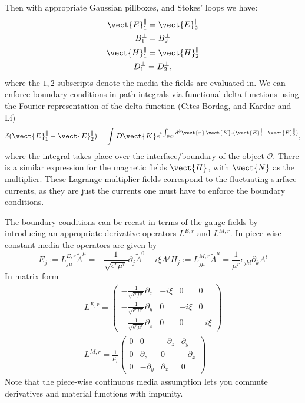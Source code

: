 Then with appropriate Gaussian pillboxes, and Stokes' loops we have:
\begin{gather}
  \vect{E}^\|_1 =\vect{E}^\|_2 \\
  B_1^\perp = B_2^\perp\\
  \vect{H}^\|_1 =\vect{H}^\|_2 \\
  D_1^\perp = D_2^\perp,
\end{gather}
where the $1,2$ subscripts denote the media the fields are evaluated in.  
We can enforce boundary conditions in path integrals via functional delta functions using
the Fourier representation of the delta function 
(Cites Bordag, and Kardar and Li)
\begin{equation}
  \delta(\vect{E}^\|_1-\vect{E}^\|_2) = \int D\vect{K} e^{i\int_{\partial \mathcal{O}} d^3\vect{x}\,
    \vect{K}\cdot(\vect{E}^\|_1-\vect{E}^\|_2)},
\end{equation}
where the integral takes place over the interface/boundary of the object $\mathcal{O}$.
There is a similar expression for the magnetic fields $\vect{H}$, with $\vect{N}$ as the multiplier.  
These Lagrange multiplier fields correspond to the fluctuating surface currents, as they 
are just the currents one must have to enforce the boundary conditions.  

The boundary conditions can be recast in terms of the gauge fields by introducing an appropriate
derivative operators $L^{E,r}$ and $L^{M,r}$.  In piece-wise constant media the operators are given by
\begin{equation}
  E_j:=L^{E,r}_{j\mu}\tilde{A}^\mu = -\frac{1}{\sqrt{\epsilon^r\mu^r}}\partial_j \tilde{A}^0+i\xi A^j
  H_j:=L^{M,r}_{j\mu}\tilde{A}^\mu = \frac{1}{\mu^r}\epsilon_{jkl}\partial_k A^l
\end{equation}
In matrix form
\begin{gather}
  L^{E,r} = \left( \begin{array}{cccc} 
      -\frac{1}{\sqrt{\epsilon^r\mu^r}}\partial_x & -i\xi & 0 & 0\\
      -\frac{1}{\sqrt{\epsilon^r\mu^r}}\partial_y & 0 &-i\xi & 0\\
      -\frac{1}{\sqrt{\epsilon^r\mu^r}}\partial_z & 0 & 0 & -i\xi
    \end{array}
  \right)\\
  L^{M,r} = \frac{1}{\mu_r}\left( \begin{array}{cccc} 
      0 & 0 & -\partial_z & \partial_y\\
      0 & \partial_z & 0 & -\partial_x\\
      0 & -\partial_y & \partial_x & 0
    \end{array}
  \right)
  \end{gather}
Note that the piece-wise continuous media assumption lets you commute derivatives and 
material functions with impunity. 

